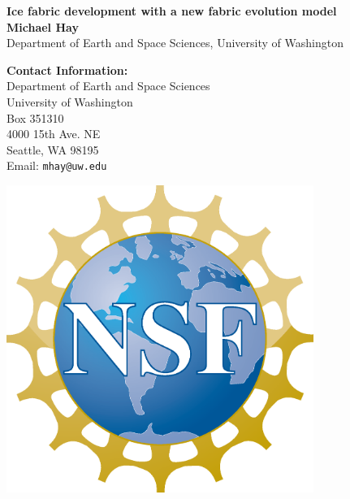 \documentclass[a0,landscape]{a0poster}
\begin{document}


\begin{minipage}[b]{0.55\linewidth}
\veryHuge \color{NavyBlue} \textbf{Ice fabric development with a new fabric evolution model} \color{Black}\\ %
\huge \textbf{Michael Hay}\\ %
\huge Department of Earth and Space Sciences, University of Washington\\ %
\end{minipage}
%
\begin{minipage}[b]{0.25\linewidth}
\color{DarkSlateGray}\Large \textbf{Contact Information:}\\
Department of Earth and Space Sciences\\
University of Washington\\
Box 351310\\
4000 15th Ave. NE\\
Seattle, WA 98195\\
Email: \texttt{mhay@uw.edu}\\ %
\end{minipage}
%
\begin{minipage}[b]{0.19\linewidth}
\includegraphics[width=10cm]{nsf1.eps} %
\end{minipage}
\end{document}
